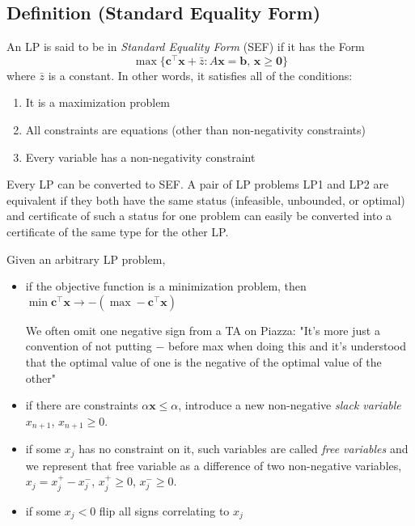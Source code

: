 \begin{defbox}
    \subsection{Definition (Standard Equality Form)}
    An LP is said to be in \emph{Standard Equality Form} (SEF) if it has the Form
    \[ \max \{\bm{c}^\top \bm{x}+\bar{z} : A \bm{x}=\bm{b},\,\bm{x}\ge \bm{0}\}\]
    where $ \bar{z} $ is a constant.
    In other words, it satisfies all of the conditions:
    \begin{enumerate}[(1)]
        \item It is a maximization problem
        \item All constraints are equations (other than non-negativity
        constraints)
        \item Every variable has a non-negativity constraint
    \end{enumerate}
\end{defbox}
Every LP can be converted to SEF. A pair of LP problems LP1 and LP2 are equivalent if they both have the
same status (infeasible, unbounded, or optimal) and certificate of such a status for one problem can easily
be converted into a certificate of the same type for the other LP.

Given an arbitrary LP problem, 
\begin{itemize}
    \item if the objective function is a minimization problem, then 
    $\min \bm{c}^\top \bm{x}\rightarrow -(\max -\bm{c}^\top \bm{x})$
        \begin{remark}
        We often omit one negative sign
        from a TA on Piazza: "It's more just a convention of not putting $ - $
        before max when doing this and it's understood that the 
        optimal value of one is the negative of the optimal value of the other"
        \end{remark} 
    \item if there are constraints $\alpha\bm{x}\le \alpha$, introduce a new
    non-negative \emph{slack variable} $x_{n+1}$, $x_{n+1}\ge 0$.
    \item if some $x_j$ has no constraint on it, such variables are called \emph{free variables} and
    we represent that free variable as a difference of two non-negative variables,
    $x_j=x_j^+-x_j^-$, $x_j^+\ge 0$, $x_j^-\ge 0$.
    \item if some $x_j<0$ flip all signs correlating to $x_j$
\end{itemize}

